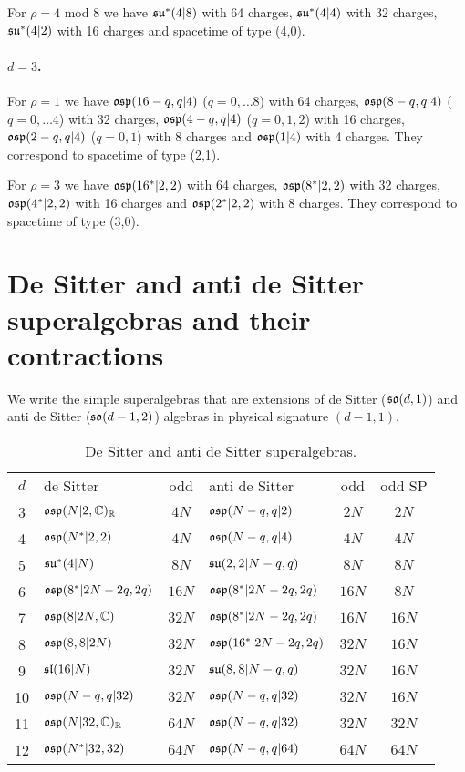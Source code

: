 \documentclass[a4paper,12pt]{article}
\begin{document}
\smallskip

\noindent For $\rho=4$ mod 8 we have $\mathfrak{su}^*(4|8)$ with 64
charges, $\mathfrak{su}^*(4|4)$ with 32 charges, $\mathfrak{su}^*(4|2)$ with 16
charges
 and spacetime of type (4,0).

 \paragraph{$d=3$.} For $\rho=1$  we have $\mathfrak{osp}(16-q,q|4)$ ($q=0,\dots 8$) with 64
 charges, $\mathfrak{osp}(8-q,q|4)$ ($q=0,\dots 4$) with 32 charges, $\mathfrak{osp}(4-q,q|4)$
 ($q=0,1,2$) with 16 charges, $\mathfrak{osp}(2-q,q|4)$ ($q=0,1$) with 8
 charges and $\mathfrak{osp}(1|4)$ with 4 charges. They correspond to  spacetime of type (2,1).

\smallskip

\noindent  For $\rho=3$  we have $\mathfrak{osp}(16^*|2,2)$ with 64
charges, $\mathfrak{osp}(8^*|2,2)$ with 32 charges, $\mathfrak{osp}(4^*|2,2)$ with
16 charges and  $\mathfrak{osp}(2^*|2,2)$ with 8 charges. They correspond
to  spacetime of type (3,0).




\section{De Sitter and anti de Sitter superalgebras and their contractions}
We write the simple superalgebras that are extensions of de Sitter
($\mathfrak{so}(d,1)$) and anti de Sitter  ($\mathfrak{so}(d-1,2)$) algebras in
physical signature $(d-1,1)$.



\begin{table}[ht]
\begin{center}
\begin{tabular} {|c|l|c||l|c||c|}
\cline{1-6}  $d$&  de Sitter& odd  & anti de Sitter&odd &odd SP
\\ \cline{1-6}  3&$\mathfrak{osp}(N|2,\mathbb{C})_{\mathbb{R}}$&$4N$
&$\mathfrak{osp}(N-q,q|2)$&$2N$& $2N$\\  4&$\mathfrak{osp}(N^*|2,2)$&$4N$&
$\mathfrak{osp}(N-q,q|4)$&$4N$& $4N$\\
 5&$\mathfrak{su}^*(4|N)$&$8N$ &$\mathfrak{su}(2,2|N-q,q)$&$8N$&$8N$\\
6&$\mathfrak{osp}(8^*|2N-2q,2q)$&$16N$& $\mathfrak{osp}(8^*|2N-2q,2q)$&$16N$&$8N$\\
7&$\mathfrak{osp}(8|2N,\mathbb{C})$&$32N$& $\mathfrak{osp}(8^*|2N-2q,2q)$&$16N$&$16N$\\ 8&
$\mathfrak{osp}(8,8|2N)$&$32N$ & $\mathfrak{osp}(16^*|2N-2q,2q)$&$32N$&$16N$\\ 9&
$\mathfrak{sl}(16|N)$&$32N$ &$\mathfrak{su}(8,8|N-q,q)$&$32N$&$16N$\\10&
$\mathfrak{osp}(N-q,q|32)$&$32N$&$\mathfrak{osp}(N-q,q|32)$&$32N$&$16N$\\
11&$\mathfrak{osp}(N|32,\mathbb{C})_{\mathbb{R}}$&$64N$& $\mathfrak{osp}(N-q,q|32)$&$32N$&$32N$\\ 12&
$\mathfrak{osp}(N^*|32,32)$&$64N$ &$\mathfrak{osp}(N-q,q|64)$&$64N$&$64N$\\
\cline{1-6}
\end{tabular}
\caption{De Sitter  and anti de Sitter
superalgebras.}\label{desitter}
\end{center}
\end{table}
\end{document}
